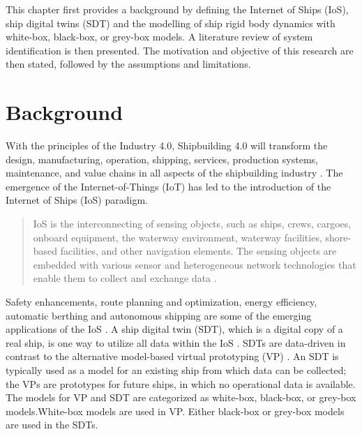 This chapter first provides a background by defining the Internet of Ships (IoS), ship digital twins (SDT) and the modelling of ship rigid body dynamics with white-box, black-box, or grey-box models. A literature review of system identification is then presented.
The motivation and objective of this research are then stated, followed by the assumptions and limitations.

\section{Background}
With the principles of the Industry 4.0, Shipbuilding 4.0 will transform the design, manufacturing, operation, shipping, services, production systems, maintenance, and value chains in all aspects of the shipbuilding 
industry \cite{stanic_toward_2018}.
The emergence of the Internet-of-Things (IoT) has led to the introduction of the Internet of Ships (IoS) paradigm. \begin{quote} IoS is the interconnecting of sensing objects, such as ships, crews, cargoes, onboard equipment, the waterway environment, waterway facilities, shore-based facilities, and other navigation elements. The sensing objects are embedded with various sensor and heterogeneous network technologies that enable them to collect and exchange data \cite{liu_internet_2016-1}.\end{quote}
Safety enhancements, route planning and optimization, energy efficiency, automatic berthing and autonomous shipping are some of the emerging applications of the IoS \cite{aslam_internet_2020}.
A ship digital twin (SDT), which is a digital copy of a real ship, is one way to utilize all data within the IoS \cite{chen_review_2021}. 
SDTs are data-driven in contrast to the alternative model-based virtual prototyping (VP) \cite{major_framework_2021}. An SDT is typically used as a model for an existing ship from which data can be collected; the VPs are  prototypes for future ships, in which no operational data is available.
The models for VP and SDT are categorized as white-box, black-box, or grey-box models.White-box models are used in VP. Either black-box or grey-box models are used in the SDTs. 

